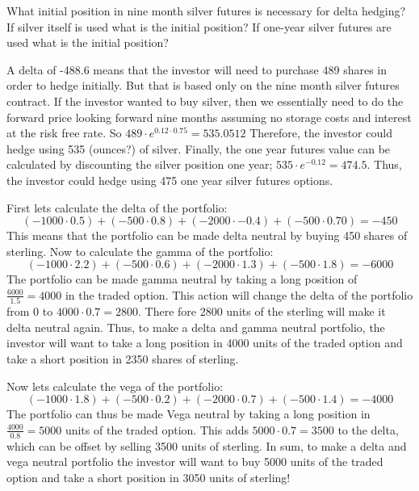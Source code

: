 \documentclass[12pt]{article}
\newenvironment{problem}[3][Problem]{\begin{trivlist}
\item[\hskip \labelsep {\bfseries #1}\hskip \labelsep {\bfseries #2.}]}{\end{trivlist}}
\begin{document}
\begin{problem}{19.11}. What initial position in nine month silver futures is necessary for delta hedging? If silver itself is used what is the initial position? If one-year silver futures are used what is the initial position? 

A delta of -488.6 means that the investor will need to purchase 489 shares in order to hedge initially. But that is based only on the nine month silver futures contract. If the investor wanted to buy silver, then we essentially need to do the forward price looking forward nine months assuming no storage costs and interest at the risk free rate. So $489\cdot e^{0.12 \cdot 0.75} = 535.0512$ Therefore, the investor could hedge using 535 (ounces?) of silver. Finally, the one year futures value can be calculated by discounting the silver position one year; $535\cdot e^{-0.12} = 474.5$. Thus, the investor could hedge using 475 one year silver futures options. 
\end{problem}

\begin{problem}{19.24}. First lets calculate the delta of the portfolio: 
$$ (-1000 \cdot 0.5) + (-500 \cdot 0.8) + (-2000 \cdot -0.4) + (-500 \cdot 0.70) = -450 $$
This means that the portfolio can be made delta neutral by buying 450 shares of sterling. Now to calculate the gamma of the portfolio:
$$ (-1000 \cdot 2.2) + (-500 \cdot 0.6) + (-2000 \cdot 1.3) + (-500 \cdot 1.8) = -6000 $$
The portfolio can be made gamma neutral by taking a long position of $\frac{6000}{1.5} = 4000$ in the traded option. This action will change the delta of the portfolio from 0 to $4000\cdot 0.7 = 2800$. There fore 2800 units of the sterling will make it delta neutral again. Thus, to make a delta and gamma neutral portfolio, the investor will want to take a long position in 4000 units of the traded option and take a short position in 2350 shares of sterling.

Now lets calculate the vega of the portfolio:
$$ (-1000 \cdot 1.8) + (-500 \cdot 0.2) + (-2000 \cdot 0.7) + (-500 \cdot 1.4) = -4000 $$
The portfolio can thus be made Vega neutral by taking a long position in $\frac{4000}{0.8} = 5000$ units of the traded option. This adds $5000 \cdot 0.7 = 3500$ to the delta, which can be offset by selling 3500 units of sterling. In sum, to make a delta and vega neutral portfolio the investor will want to buy 5000 units of the traded option and take a short position in 3050 units of sterling! 
\end{problem}
\end{document}
